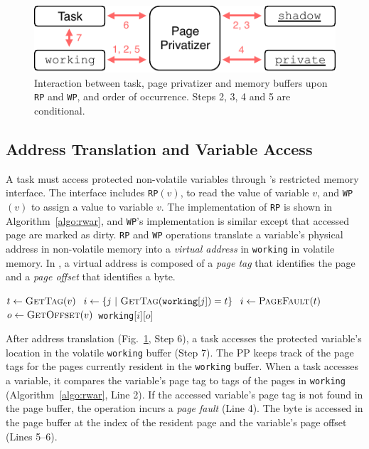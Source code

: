 \begin{figure}
    \centering
    \includegraphics[width=\columnwidth]{figures/mem-man.pdf}
    \caption{Interaction between task, page privatizer and memory buffers upon \texttt{RP} and \texttt{WP}, and order of occurrence. Steps 2, 3, 4 and 5 are conditional.}
    \label{figure:mem-man}
\end{figure}

\subsection{Address Translation and Variable Access}

A task must access protected non-volatile variables through \sys's restricted memory interface.
The interface includes \texttt{RP}$(v)$, to read the value of variable $v$, and \texttt{WP}$(v)$ to assign a value to variable $v$.
The implementation of {\tt RP} is shown in Algorithm~\ref{algo:rwar}, and {\tt WP}'s implementation is similar except that accessed page are marked as dirty.
{\tt RP} and {\tt WP} operations translate a variable's physical address in non-volatile memory into a \emph{virtual address} in \texttt{working} in volatile memory.
In \sys, a virtual address is composed of a \emph{page tag} that identifies the page and a \emph{page offset} that identifies a byte.

\begin{algorithm}[t]
    \label{algo:rwar}
    \scriptsize
    \begin{algorithmic}[1]
		\State $t \leftarrow \Call{GetTag}{v}$
        \State $i \gets \{ j\ |\ \Call{GetTag}{\texttt{working}[j]} = t \}$ 
		 
		\State	$i \gets \Call{PageFault}{t}$ 
		\EndIf
		\State $o \leftarrow \Call{GetOffset}{v}$
		\State \Return \texttt{working}[$i$][$o$]  
	\end{algorithmic}
\end{algorithm}

After address translation (Fig.~\ref{figure:mem-man}, Step 6), a task accesses the protected variable's location in the volatile \texttt{working} buffer (Step 7). The PP keeps track of the page tags for the pages currently resident in the \texttt{working} buffer. When a task accesses a variable, it compares the variable's page tag to tags of the pages in {\tt working} (Algorithm~\ref{algo:rwar}, Line 2). If the accessed variable's page tag is not found in the page buffer, the operation incurs a {\em page fault} (Line 4). The byte is accessed in the page buffer at the index of the resident page and the variable's page offset (Lines 5--6).

